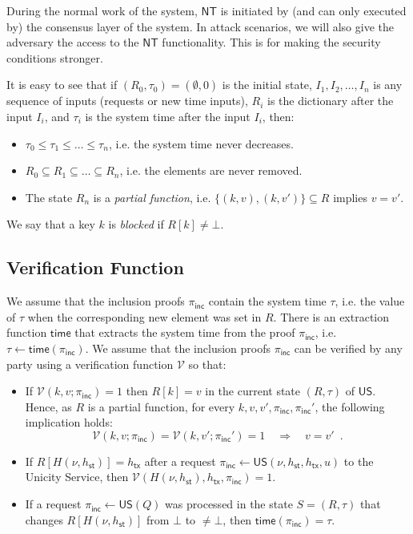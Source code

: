 \documentclass{article}
\newcommand{\unisrv}[0]{\mathsf{US}}
\newcommand{\sthash}[0]{h_\mathsf{st}}
\newcommand{\txhash}[0]{h_\mathsf{tx}}
\newcommand{\univer}[0]{\mathcal{V}}
\newcommand{\pinc}[0]{\pi_{\mathsf{inc}}}
\newcommand{\predi}[0]{\nu}
\newcommand{\systime}[0]{\tau}
\newcommand{\newtime}[0]{\mathsf{NT}}
\newcommand{\exttime}[0]{\mathsf{time}}
\begin{document}


\noindent During the normal work of the system, $\newtime$ is initiated by (and can only executed by) the consensus layer of the system. In attack scenarios, we will also give the adversary the access to the $\newtime$ functionality. This is for making the security conditions stronger. \medskip


\noindent It is easy to see that if $(R_0,\systime_0) = (\emptyset,0)$ is the initial state, $I_1, I_2, \ldots, I_n$ is any sequence of inputs (requests or new time inputs), $R_i$ is the dictionary after the input $I_i$, and $\systime_i$ is the system time after the input $I_i$, then:
\begin{itemize}
\item $\systime_0 \le \systime_1 \le \ldots \le \systime_n$, i.e.
the system time never decreases.
\item $R_0 \subseteq R_1 \subseteq \ldots \subseteq R_n$, i.e. the elements are never removed.
\item The state $R_n$ is a \emph{partial function}, i.e.
$\{(k, v), (k, v')\} \subseteq R$ implies $v = v'$.
\end{itemize}

We say that a key $k$ is \emph{blocked} if $R[k] \neq \bot$.

\subsection{Verification Function}

We assume that the inclusion proofs $\pinc$ contain the system time $\systime$, i.e. the value of $\systime$ when the corresponding new element was set in $R$. There is an extraction function $\exttime$ that
extracts the system time from the proof $\pinc$, i.e. $\systime\gets \exttime(\pinc)$.
We assume that the inclusion proofs $\pinc$ can be verified by any party using a verification function $\univer$ so that:
\begin{itemize}
\item If $\univer(k, v; \pinc) = 1$ then $R[k] = v$ in the current state $(R,\systime)$ of $\unisrv$. Hence, as $R$ is a partial function, for every $k, v, v', \pinc, \pinc'$, the following implication holds:
\begin{equation}\label{eq:eqtx-pred}
\univer(k, v; \pinc) = \univer(k, v'; \pinc') = 1 \quad \Rightarrow \quad v =v' \enspace.
\end{equation}
\item If $R[H(\predi, \sthash)] = \txhash$ after a request $\pinc \gets \unisrv(\predi, \sthash, \txhash, u)$ to the Unicity Service, then $\univer(H(\predi, \sthash), \txhash, \pinc) = 1$.
\item If a request $\pinc\gets\unisrv(Q)$ was processed in the state $S=(R,\systime)$ that changes $R[H(\predi, \sthash)]$ from $\bot$ to $\neq\bot$, then $\exttime(\pinc)=\systime$.
\end{itemize}
\end{document}
